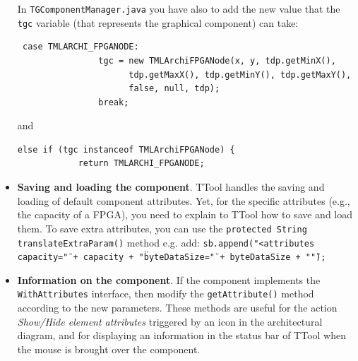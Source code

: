 \documentclass[12pt]{article}
\begin{document}
\begin{itemize}
In \texttt{TGComponentManager.java} you have also to add the new value that the \texttt{tgc} variable (that represents the graphical component) can take:
\begin{lstlisting}
 case TMLARCHI_FPGANODE:
                tgc = new TMLArchiFPGANode(x, y, tdp.getMinX(),
                      tdp.getMaxX(), tdp.getMinY(), tdp.getMaxY(),
                      false, null, tdp);
                break;
\end{lstlisting}

and 

\begin{lstlisting}
else if (tgc instanceof TMLArchiFPGANode) {
            return TMLARCHI_FPGANODE;
\end{lstlisting}



\item \textbf{Saving and loading the component}. TTool handles the saving and loading of default component attributes. Yet, for the specific attributes (e.g., the capacity of a FPGA), you need to explain to TTool how to save and load them. To save extra attributes, you can use the  \texttt{protected String translateExtraParam()} method e.g. add:
\texttt{sb.append("<attributes capacity=\"" + capacity + "\" byteDataSize=\"" + byteDataSize + "\" ");}

\item \textbf{Information on the component}. If the component implements the \texttt{WithAttributes} interface, then modify the \texttt{getAttribute()} method according to the new parameters. These methods are useful for the action \textit{Show/Hide element attributes} triggered by an icon in the architectural diagram, and for displaying an information in the status bar of TTool when the mouse is brought over the component.

\end{itemize}
\end{document}
